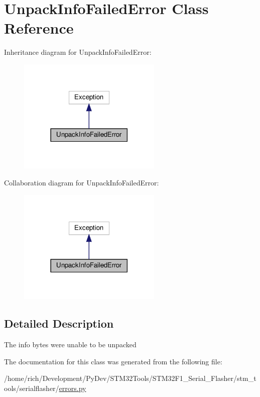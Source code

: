 \hypertarget{classstm__tools_1_1serialflasher_1_1errors_1_1UnpackInfoFailedError}{}\section{Unpack\+Info\+Failed\+Error Class Reference}
\label{classstm__tools_1_1serialflasher_1_1errors_1_1UnpackInfoFailedError}


Inheritance diagram for Unpack\+Info\+Failed\+Error\+:
\nopagebreak
\begin{figure}[H]
\begin{center}
\leavevmode
\includegraphics[width=194pt]{classstm__tools_1_1serialflasher_1_1errors_1_1UnpackInfoFailedError__inherit__graph}
\end{center}
\end{figure}


Collaboration diagram for Unpack\+Info\+Failed\+Error\+:
\nopagebreak
\begin{figure}[H]
\begin{center}
\leavevmode
\includegraphics[width=194pt]{classstm__tools_1_1serialflasher_1_1errors_1_1UnpackInfoFailedError__coll__graph}
\end{center}
\end{figure}


\subsection{Detailed Description}
\begin{DoxyVerb}The info bytes were unable to be unpacked\end{DoxyVerb}
 

The documentation for this class was generated from the following file\+:\begin{DoxyCompactItemize}
\item 
/home/rich/\+Development/\+Py\+Dev/\+S\+T\+M32\+Tools/\+S\+T\+M32\+F1\+\_\+\+Serial\+\_\+\+Flasher/stm\+\_\+tools/serialflasher/\hyperlink{errors_8py}{errors.\+py}\end{DoxyCompactItemize}
